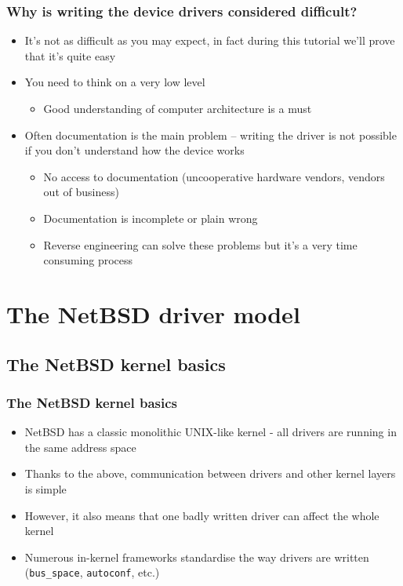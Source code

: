 \documentclass[dvipsnames,table]{beamer}
\begin{document}
\begin{frame}
\frametitle{Why is writing the device drivers considered difficult?}
\begin{itemize}
	\item It's not as difficult as you may expect, in fact during this tutorial we'll prove that it's quite easy
	\item You need to think on a very low level
	\begin{itemize}
		\item Good understanding of computer architecture is a must
	\end{itemize}
	\item Often documentation is the main problem -- writing the driver is not possible if you don't understand how the device works
	\begin{itemize}
		\item No access to documentation (uncooperative hardware vendors, vendors out of business)
		\item Documentation is incomplete or plain wrong
		\item Reverse engineering can solve these problems but it's a very time consuming process
	\end{itemize}
\end{itemize}
\end{frame}

\section{The NetBSD driver model}
\subsection{The NetBSD kernel basics}

\begin{frame}
\frametitle{The NetBSD kernel basics}
\begin{itemize}
	\item NetBSD has a classic monolithic UNIX-like kernel - all drivers are running in the same address space
	\item Thanks to the above, communication between drivers and other kernel layers is simple
	\item However, it also means that one badly written driver can affect the whole kernel
	\item Numerous in-kernel frameworks standardise the way drivers are written ({\tt bus\_space}, {\tt autoconf}, etc.) 
\end{itemize}
\end{frame}
\end{document}
